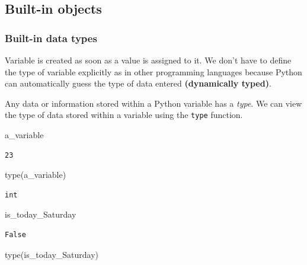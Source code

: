 \documentclass[
  letterpaper,
  DIV=11,
  numbers=noendperiod]{scrreprt}
\newenvironment{Shaded}{\begin{snugshade}}{\end{snugshade}}
\newcommand{\BuiltInTok}[1]{\textcolor[rgb]{0.00,0.23,0.31}{#1}}
\newcommand{\NormalTok}[1]{\textcolor[rgb]{0.00,0.23,0.31}{#1}}
\begin{document}
\hypertarget{built-in-objects}{%
\subsection{Built-in objects}\label{built-in-objects}}

\hypertarget{built-in-data-types}{%
\subsubsection{Built-in data types}\label{built-in-data-types}}

Variable is created as soon as a value is assigned to it. We don't have
to define the type of variable explicitly as in other programming
languages because Python can automatically guess the type of data
entered \textbf{(dynamically typed)}.

Any data or information stored within a Python variable has a
\emph{type}. We can view the type of data stored within a variable using
the \texttt{type} function.

\begin{Shaded}
\begin{Highlighting}[]
\NormalTok{a\_variable}
\end{Highlighting}
\end{Shaded}

\begin{verbatim}
23
\end{verbatim}

\begin{Shaded}
\begin{Highlighting}[]
\BuiltInTok{type}\NormalTok{(a\_variable)}
\end{Highlighting}
\end{Shaded}

\begin{verbatim}
int
\end{verbatim}

\begin{Shaded}
\begin{Highlighting}[]
\NormalTok{is\_today\_Saturday}
\end{Highlighting}
\end{Shaded}

\begin{verbatim}
False
\end{verbatim}

\begin{Shaded}
\begin{Highlighting}[]
\BuiltInTok{type}\NormalTok{(is\_today\_Saturday)}
\end{Highlighting}
\end{Shaded}
\end{document}
